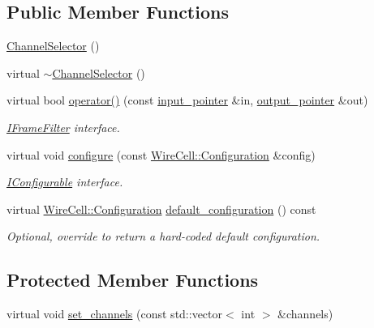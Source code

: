 \subsection*{Public Member Functions}
\begin{DoxyCompactItemize}
\item 
\hyperlink{class_wire_cell_1_1_sig_proc_1_1_channel_selector_a4c48ffaf3392f6a27d9f2086adbed89c}{Channel\+Selector} ()
\item 
virtual \hyperlink{class_wire_cell_1_1_sig_proc_1_1_channel_selector_a918cd253d71e3a26e6b6bb8b1be52eed}{$\sim$\+Channel\+Selector} ()
\item 
virtual bool \hyperlink{class_wire_cell_1_1_sig_proc_1_1_channel_selector_aaca59eb8b7d47e29fed24f6976adc4f3}{operator()} (const \hyperlink{class_wire_cell_1_1_i_function_node_a55c0946156df9b712b8ad1a0b59b2db6}{input\+\_\+pointer} \&in, \hyperlink{class_wire_cell_1_1_i_function_node_afc02f1ec60d31aacddf64963f9ca650b}{output\+\_\+pointer} \&out)
\begin{DoxyCompactList}\small\item\em \hyperlink{class_wire_cell_1_1_i_frame_filter}{I\+Frame\+Filter} interface. \end{DoxyCompactList}\item 
virtual void \hyperlink{class_wire_cell_1_1_sig_proc_1_1_channel_selector_aa7bedd9af19095a19bdd9f2db59b043a}{configure} (const \hyperlink{namespace_wire_cell_a9f705541fc1d46c608b3d32c182333ee}{Wire\+Cell\+::\+Configuration} \&config)
\begin{DoxyCompactList}\small\item\em \hyperlink{class_wire_cell_1_1_i_configurable}{I\+Configurable} interface. \end{DoxyCompactList}\item 
virtual \hyperlink{namespace_wire_cell_a9f705541fc1d46c608b3d32c182333ee}{Wire\+Cell\+::\+Configuration} \hyperlink{class_wire_cell_1_1_sig_proc_1_1_channel_selector_a4327241e133cc7aa3d336bec304cc568}{default\+\_\+configuration} () const
\begin{DoxyCompactList}\small\item\em Optional, override to return a hard-\/coded default configuration. \end{DoxyCompactList}\end{DoxyCompactItemize}
\subsection*{Protected Member Functions}
\begin{DoxyCompactItemize}
\item 
virtual void \hyperlink{class_wire_cell_1_1_sig_proc_1_1_channel_selector_a4f6162b720052e906073139e952769e5}{set\+\_\+channels} (const std\+::vector$<$ int $>$ \&channels)
\end{DoxyCompactItemize}
